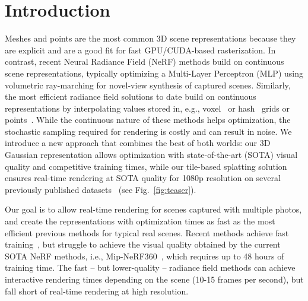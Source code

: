 \section{Introduction}

Meshes and points are the most common 3D scene representations because they are explicit and are a good fit for fast GPU/CUDA-based rasterization.
In contrast, recent Neural Radiance Field (NeRF) methods build on continuous scene representations, typically optimizing a Multi-Layer Perceptron (MLP) using volumetric ray-marching for novel-view synthesis of captured scenes. Similarly, the most efficient radiance field solutions to date build on continuous representations by interpolating values stored in, e.g., voxel~\cite{plenoxels} or hash~\cite{mueller2022instant} grids or points~\cite{xu2022point}.
While the continuous nature of these methods helps optimization, the stochastic sampling required for rendering is costly and can result in noise.
We introduce a new approach that combines the best of both worlds: our 3D Gaussian representation allows optimization with state-of-the-art (SOTA) visual quality and competitive training times,
while our tile-based splatting solution ensures real-time rendering at SOTA quality for 1080p resolution on several previously published datasets~\cite{knapitsch2017tanks,hedman2018deep,barron2022mipnerf360} (see Fig.~\ref{fig:teaser}).


Our goal is to allow real-time rendering for scenes captured with multiple photos, and create the representations with optimization times as fast as the most efficient previous methods for typical real scenes.
Recent methods achieve fast training~\cite{plenoxels,mueller2022instant}, but struggle to achieve the visual quality obtained by the current SOTA NeRF methods, i.e., Mip-NeRF360~\cite{barron2022mipnerf360}, which requires up to 48 hours of training time. The fast -- but lower-quality -- radiance field methods can achieve interactive rendering times depending on the scene (10-15 frames per second), but fall short of real-time rendering  at high resolution.

